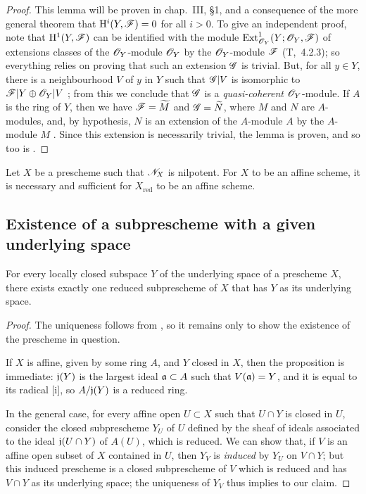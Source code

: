 \begin{proof}
\label{proof-1.5.1.9}
This lemma will be proven in chap.~III, §1, and a consequence of the more general theorem that $\mathrm{H}^i(Y,\mathscr{F})=0$ for all $i>0$.
To give an independent proof, note that $\mathrm{H}^1(Y,\mathscr{F})$ can be identified with the module ${\mathop{\mathrm{Ext}}\nolimits}_{\mathscr{O}_Y}^1(Y;\mathscr{O}_Y,\mathscr{F})$ of extensions classes of the $\mathscr{O}_Y$-module $\mathscr{O}_Y$ by the $\mathscr{O}_Y$-module $\mathscr{F}$ (T,~4.2.3);
so everything relies on proving that such an extension $\mathscr{G}$ is trivial.
But, for all $y\in Y$, there is a neighbourhood $V$ of $y$ in $Y$ such that $\mathscr{G}|V$ is isomorphic to $\mathscr{F}|Y\oplus\mathscr{O}_Y|V$ ;
from this we conclude that $\mathscr{G}$ is a \emph{quasi-coherent} $\mathscr{O}_Y$-module.
If $A$ is the ring of $Y$, then we have $\mathscr{F}=\widetilde{M}$ and $\mathscr{G}=\widetilde{N}$, where $M$ and $N$ are $A$-modules, and, by hypothesis, $N$ is an extension of the $A$-module $A$ by the $A$-module $M$ .
Since this extension is necessarily trivial, the lemma is proven, and so too is .
\end{proof}

\begin{cor}[5.1.10]
\label{1.5.1.10}
Let $X$ be a prescheme such that $\mathscr{N}_X$ is nilpotent.
For $X$ to be an affine scheme, it is necessary and sufficient for $X_\mathrm{red}$ to be an affine scheme.
\end{cor}

\subsection{Existence of a subprescheme with a given underlying space}
\label{subsection-existence-of-a-subprescheme-with-a-given-underlying-space}

\begin{prop}[5.2.1]
\label{1.5.2.1}
For every locally closed subspace $Y$ of the underlying space of a prescheme $X$, there exists exactly one reduced subprescheme of $X$ that has $Y$ as its underlying space.
\end{prop}

\begin{proof}
\label{proof-1.5.2.1}
The uniqueness follows from , so it remains only to show the existence of the prescheme in question.

If $X$ is affine, given by some ring $A$, and $Y$ closed in $X$, then the proposition is immediate:
$\mathfrak{j}(Y)$ is the largest ideal $\mathfrak{a}\subset A$ such that $V(\mathfrak{a})=Y$, and it is equal to its radical [i], so $A/\mathfrak{j}(Y)$ is a reduced ring.

In the general case, for every affine open $U\subset X$ such that $U\cap Y$ is closed in $U$, consider the closed subprescheme $Y_U$ of $U$ defined by the sheaf of ideals associated to the ideal $\mathfrak{j}(U\cap Y)$ of $A(U)$, which is reduced.
We can show that, if $V$ is an affine open subset of $X$ contained in $U$, then $Y_V$ is \emph{induced} by $Y_U$ on $V\cap Y$;
but this induced prescheme is a closed subprescheme of $V$ which is reduced and has $V\cap Y$ as its underlying space;
the uniqueness of $Y_V$ thus implies to our claim.
\end{proof}

